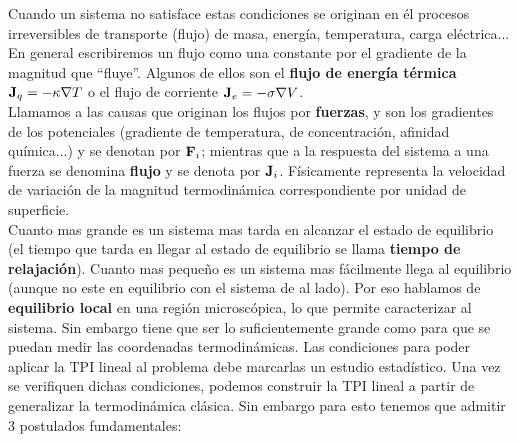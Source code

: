 \documentclass[12pt,a4paper,oneside]{book}
\begin{document}
Cuando un sistema no satisface estas condiciones se originan en él procesos irreversibles de transporte (flujo) de masa, energía, temperatura, carga eléctrica... En general escribiremos un flujo como una constante por el gradiente de la magnitud que ``fluye''. Algunos de ellos son el \textbf{flujo de energía térmica} $\textbf{J}_q = - \kappa \nabla T$ o el flujo de corriente $\textbf{J}_e = - \sigma  \nabla V$. \\

Llamamos a las causas que originan los flujos por \textbf{fuerzas}, y son los gradientes de los potenciales (gradiente de temperatura, de concentración, afinidad química...) y se denotan por $\textbf{F}_i$; mientras que a la respuesta del sistema a una fuerza se denomina \textbf{flujo} y se denota por $\textbf{J}_i$. Físicamente representa la velocidad de variación de la magnitud termodinámica correspondiente por unidad de superficie. \\

Cuanto mas grande es un sistema mas tarda en alcanzar el estado de equilibrio (el tiempo que tarda en llegar al estado de equilibrio se llama \textbf{tiempo de relajación}). Cuanto mas pequeño es un sistema mas fácilmente llega al equilibrio (aunque no este en equilibrio con el sistema de al lado). Por eso hablamos de \textbf{equilibrio local} en una región microscópica, lo que permite caracterizar al sistema. Sin embargo tiene que ser lo suficientemente grande como para que se puedan medir las coordenadas termodinámicas. Las condiciones para poder aplicar la TPI lineal al problema debe marcarlas un estudio estadístico. Una vez se verifiquen dichas condiciones, podemos construir la TPI lineal a partir de generalizar la termodinámica clásica. Sin embargo para esto tenemos que admitir 3 postulados fundamentales:
\end{document}
